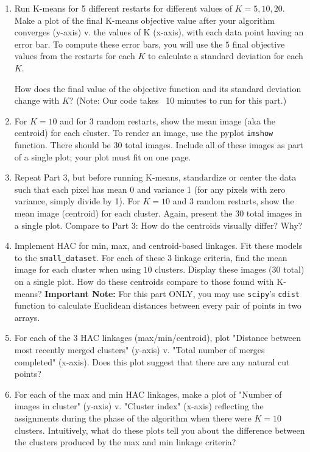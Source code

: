 \documentclass[submit]{harvardml}
\begin{document}
\begin{problem}
\begin{enumerate}
\item Run K-means for 5 different restarts for different values of $K = 5, 10, 20$. Make a plot of the final K-means objective value after your algorithm converges (y-axis) v. the values of K (x-axis), with each data point having an error bar. To compute these error bars, you will use the $5$ final objective values from the restarts for each $K$ to calculate a standard deviation for each $K$.

  How does the final value of the objective function and its standard deviation change with $K$? (Note: Our code takes ~10 minutes to run for this part.)
  
\item For $K=10$ and for 3 random restarts, show the mean
  image (aka the centroid) for each cluster.
  To render an image, use the pyplot
  \texttt{imshow} function. There should be 30 total images. Include all of these images
  as part of a single plot; your plot must fit on one page.

\item Repeat Part 3, but before running K-means, standardize or center the data such that each pixel has mean
  0 and variance 1 (for any pixels with zero variance, simply divide by 1). For $K=10$ and 3 random restarts,
  show the mean image (centroid) for each cluster. Again, present the 30 total images in a single plot. Compare to Part 3: How do the centroids visually differ? Why? 

\item Implement HAC for min, max, and centroid-based linkages. Fit these models to the \texttt{small\_dataset}. 
  For each of these 3 linkage criteria, find the mean image for each cluster when using $10$ clusters. Display these images (30 total) on a single plot.
  How do these centroids compare to those found with K-means? \textbf{Important Note:} For this part ONLY, you may use \texttt{scipy}'s \texttt{cdist} function to calculate Euclidean distances between every pair of points in two arrays.

\item For each of the 3 HAC linkages (max/min/centroid), plot
  "Distance between most recently merged clusters" (y-axis) v. "Total number of merges completed" (x-axis).
  Does this plot suggest that there are any  natural cut points? 

\item For each of the max and min HAC linkages, make a plot of "Number of images in cluster" (y-axis) v. "Cluster index" (x-axis) reflecting the assignments during
	the phase of the algorithm when there were $K=10$
	clusters. Intuitively, what do these plots tell you about the difference between the clusters produced by the max and min linkage criteria?


\end{enumerate}
\end{problem}
\end{document}
